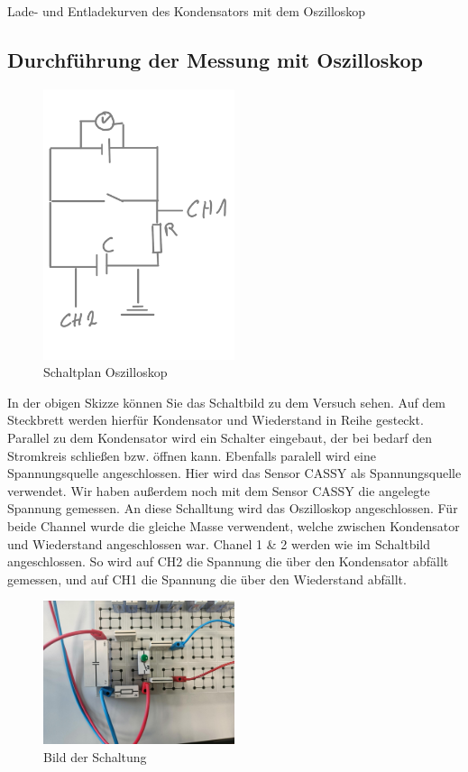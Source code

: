 \documentclass[twoside]{protokoll}
\begin{document}
\begin{aufgabe}{Lade- und Entladekurven des Kondensators mit dem Oszilloskop}
  \subsection{Durchführung der Messung mit Oszilloskop}  
  
  \begin{figure}[H]
  \centering
  \includegraphics[width=0.5\textwidth]{schaltzkisse-osziloskop.pdf}
  \caption{Schaltplan Oszilloskop}
  \centering
  \end{figure}

  In der obigen Skizze können Sie das Schaltbild zu dem Versuch sehen. 
  Auf dem Steckbrett werden hierfür Kondensator und Wiederstand in Reihe gesteckt.
  Parallel zu dem Kondensator wird ein Schalter eingebaut, der bei bedarf den Stromkreis
  schließen bzw. öffnen kann. Ebenfalls paralell wird eine Spannungsquelle angeschlossen. 
  Hier wird das Sensor CASSY als Spannungsquelle verwendet. Wir haben außerdem noch mit dem
  Sensor CASSY die angelegte Spannung gemessen. An diese Schalltung wird das
  Oszilloskop angeschlossen. Für beide Channel wurde die gleiche Masse verwendent, welche zwischen Kondensator und Wiederstand angeschlossen war.
  Chanel 1 \& 2 werden wie im Schaltbild angeschlossen.
  So wird auf CH2 die Spannung die über den Kondensator abfällt gemessen, und 
  auf CH1 die Spannung die über den Wiederstand abfällt. 

  \begin{figure}[H]
  \centering
  \includegraphics[width=0.5\textwidth]{Bilder_Osziloskop/Schaltung_Osziloskop_02.pdf}
  \caption{Bild der Schaltung}
  \centering
  \end{figure}
 

\end{aufgabe}
\end{document}
